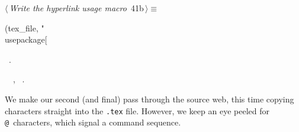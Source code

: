 \documentclass[a4paper]{report}
\begin{document}
\begin{flushleft} \small
\begin{minipage}{\linewidth}\label{scrap75}\raggedright\small
{} $\langle\,${\it Write the hyperlink usage macro}\nobreak\ {\footnotesize {41b}}$\,\rangle\equiv$
\vspace{-1ex}
\begin{list}{}{} \item
\mbox{}\verb@fprintf(tex_file, "\\usepackage[%s]{hyperref}", hyperoptions);@{\NWsep}
\end{list}
\vspace{-1.5ex}
\footnotesize
\begin{list}{}{\setlength{\itemsep}{-\parsep}\setlength{\itemindent}{-\leftmargin}}
\item \NWtxtMacroRefIn\ .
\item \NWtxtIdentsUsed\nobreak\  \verb@fprintf@\nobreak\ , \verb@hyperoptions@\nobreak\ .
\item{}
\end{list}
\end{minipage}\vspace{4ex}
\end{flushleft}
We make our second (and final) pass through the source web, this time
copying characters straight into the \verb|.tex| file. However, we keep
an eye peeled for \verb|@|~characters, which signal a command sequence.
\end{document}
